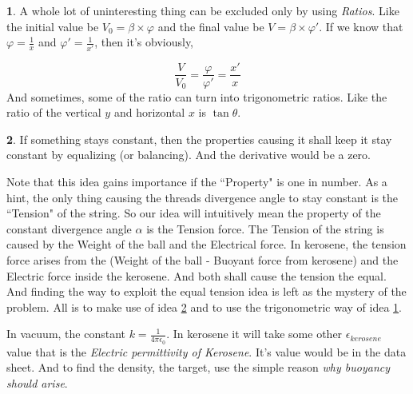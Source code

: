 \documentclass[11pt,a4paper,twocolumn,openright]{article}
\theoremstyle{definition}
\theoremstyle{definition}
\theoremstyle{definition}
\newtheorem{idea}{ \framebox[0.05\textwidth]{{\sffamily Idea}} }
\theoremstyle{definition}
\begin{document}
\begin{idea} \label{ratio}
A whole lot of uninteresting thing can be excluded only by using \emph{Ratios}. Like the initial value be $V_0 = \beta \times \varphi$ and the final value be $V = \beta \times \varphi'$. If we know that $\varphi = \frac{1}{x}$ and $\varphi'=\frac{1}{x'}$, then it's obviously, 

\[ \frac{V}{V_0} = \frac{\varphi}{\varphi'} = \frac{x'}{x} \]
And sometimes, some of the ratio can turn into trigonometric ratios. Like the ratio of the vertical $y$ and horizontal $x$ is $\tan \theta$. 
\end{idea}

\begin{idea} \label{idconst}
If something stays constant, then the properties causing it shall keep it stay constant by equalizing (or balancing). And the derivative would be a zero.
\end{idea}

{\small Note that this idea gains importance if the ``Property" is one in number. As a hint, the only thing causing the threads divergence angle to stay constant is the ``Tension" of the string. So our idea will intuitively mean the property of the constant divergence angle $\alpha$ is the Tension force. The Tension of the string is caused by the Weight of the ball and the Electrical force. In kerosene, the tension force arises from the (Weight of the ball - Buoyant force from kerosene) and the Electric force inside the kerosene. And both shall cause the tension the equal. And finding the way to exploit the equal tension idea is left as the mystery of the problem. All is to make use of idea \ref{idconst} and to use the trigonometric way of idea \ref{ratio}. } 

{\small In vacuum, the constant $k = \frac{1}{4 \pi \epsilon _0} $. In kerosene it will take some other $ \epsilon_{kerosene}$ value that is the \emph{Electric permittivity of Kerosene}. It's value would be in the data sheet. And to find the density, the target, use the simple reason \emph{why buoyancy should arise}.}

 
\end{document}
